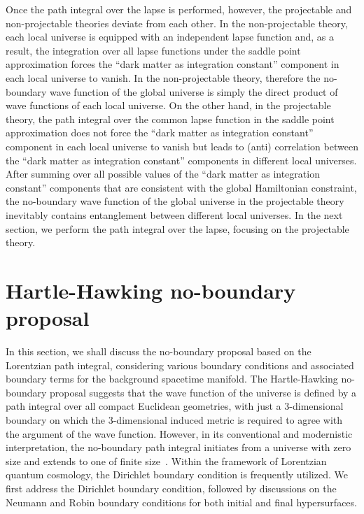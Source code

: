 \documentclass[superscriptaddress,aps,preprintnumbers,nofootinbib]{revtex4-2}
\begin{document}
Once the path integral over the lapse is performed, however, the projectable and non-projectable theories deviate from each other. In the non-projectable theory, each local universe is equipped with an independent lapse function and, as a result, the integration over all lapse functions under the saddle point approximation forces the ``dark matter as integration constant'' component in each local universe to vanish. In the non-projectable theory, therefore the no-boundary wave function of the global universe is simply the direct product of wave functions of each local universe. On the other hand, in the projectable theory, the path integral over the common lapse function in the saddle point approximation does not force the ``dark matter as integration constant'' component in each local universe to vanish but leads to (anti) correlation between the ``dark matter as integration constant'' components in different local universes. After summing over all possible values of the ``dark matter as integration constant'' components that are consistent with the global Hamiltonian constraint, the no-boundary wave function of the global universe in the projectable theory inevitably contains entanglement between different local universes. In the next section, we perform the path integral over the lapse, focusing on the projectable theory. 



\section{Hartle-Hawking no-boundary proposal}
\label{sec:no-boundary-proposal}


In this section, we shall discuss the no-boundary proposal based on the Lorentzian path integral, considering various boundary conditions and associated boundary terms for the background spacetime manifold. The Hartle-Hawking no-boundary proposal suggests that the wave function of the universe is defined by a path integral over all compact Euclidean geometries, with just a $3$-dimensional boundary on which the $3$-dimensional induced metric is required to agree with the argument of the wave function.
However, in its conventional and modernistic interpretation, the no-boundary path integral initiates from a universe with zero size and extends to one of finite size~\cite{Halliwell:1988ik}. Within the framework of Lorentzian quantum cosmology, the Dirichlet boundary condition is frequently utilized. We first address the Dirichlet boundary condition, followed by discussions on the Neumann and Robin boundary conditions for both initial and final hypersurfaces.
\end{document}
